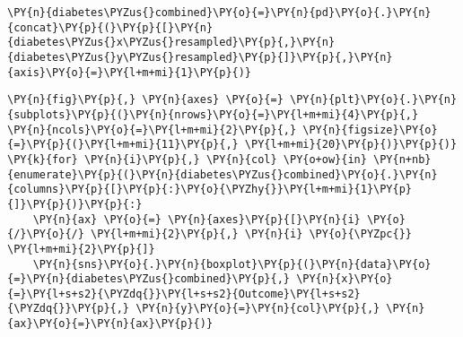     \begin{tcolorbox}[breakable, size=fbox, boxrule=1pt, pad at break*=1mm,colback=cellbackground, colframe=cellborder]
\begin{Verbatim}[commandchars=\\\{\}]
\PY{n}{diabetes\PYZus{}combined}\PY{o}{=}\PY{n}{pd}\PY{o}{.}\PY{n}{concat}\PY{p}{(}\PY{p}{[}\PY{n}{diabetes\PYZus{}x\PYZus{}resampled}\PY{p}{,}\PY{n}{diabetes\PYZus{}y\PYZus{}resampled}\PY{p}{]}\PY{p}{,}\PY{n}{axis}\PY{o}{=}\PY{l+m+mi}{1}\PY{p}{)}
\end{Verbatim}
\end{tcolorbox}

    \begin{tcolorbox}[breakable, size=fbox, boxrule=1pt, pad at break*=1mm,colback=cellbackground, colframe=cellborder]
\begin{Verbatim}[commandchars=\\\{\}]
\PY{n}{fig}\PY{p}{,} \PY{n}{axes} \PY{o}{=} \PY{n}{plt}\PY{o}{.}\PY{n}{subplots}\PY{p}{(}\PY{n}{nrows}\PY{o}{=}\PY{l+m+mi}{4}\PY{p}{,} \PY{n}{ncols}\PY{o}{=}\PY{l+m+mi}{2}\PY{p}{,} \PY{n}{figsize}\PY{o}{=}\PY{p}{(}\PY{l+m+mi}{11}\PY{p}{,} \PY{l+m+mi}{20}\PY{p}{)}\PY{p}{)}
\PY{k}{for} \PY{n}{i}\PY{p}{,} \PY{n}{col} \PY{o+ow}{in} \PY{n+nb}{enumerate}\PY{p}{(}\PY{n}{diabetes\PYZus{}combined}\PY{o}{.}\PY{n}{columns}\PY{p}{[}\PY{p}{:}\PY{o}{\PYZhy{}}\PY{l+m+mi}{1}\PY{p}{]}\PY{p}{)}\PY{p}{:}
    \PY{n}{ax} \PY{o}{=} \PY{n}{axes}\PY{p}{[}\PY{n}{i} \PY{o}{/}\PY{o}{/} \PY{l+m+mi}{2}\PY{p}{,} \PY{n}{i} \PY{o}{\PYZpc{}} \PY{l+m+mi}{2}\PY{p}{]}
    \PY{n}{sns}\PY{o}{.}\PY{n}{boxplot}\PY{p}{(}\PY{n}{data}\PY{o}{=}\PY{n}{diabetes\PYZus{}combined}\PY{p}{,} \PY{n}{x}\PY{o}{=}\PY{l+s+s2}{\PYZdq{}}\PY{l+s+s2}{Outcome}\PY{l+s+s2}{\PYZdq{}}\PY{p}{,} \PY{n}{y}\PY{o}{=}\PY{n}{col}\PY{p}{,} \PY{n}{ax}\PY{o}{=}\PY{n}{ax}\PY{p}{)}
\end{Verbatim}
\end{tcolorbox}

    \begin{center}
    \end{center}
    { \hspace*{\fill} \\}
    
